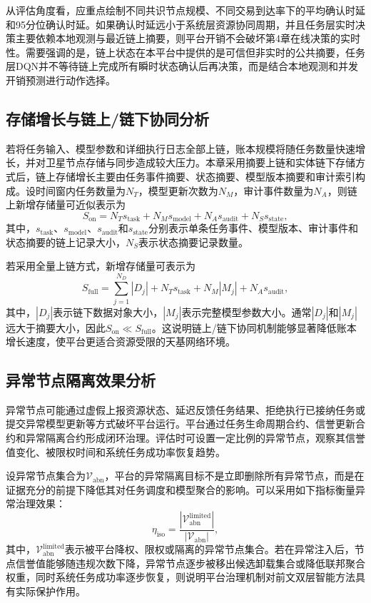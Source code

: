从评估角度看，应重点绘制不同共识节点规模、不同交易到达率下的平均确认时延和95分位确认时延。如果确认时延远小于系统层资源协同周期，并且任务层实时决策主要依赖本地观测与最近链上摘要，则平台开销不会破坏第4章在线决策的实时性。需要强调的是，链上状态在本平台中提供的是可信但非实时的公共摘要，任务层DQN并不等待链上完成所有瞬时状态确认后再决策，而是结合本地观测和并发开销预测进行动作选择。

\subsection{存储增长与链上/链下协同分析}

若将任务输入、模型参数和详细执行日志全部上链，账本规模将随任务数量快速增长，并对卫星节点存储与同步造成较大压力。本章采用摘要上链和实体链下存储方式后，链上存储增长主要由任务事件摘要、状态摘要、模型版本摘要和审计索引构成。设时间窗内任务数量为\(N_T\)，模型更新次数为\(N_M\)，审计事件数量为\(N_A\)，则链上新增存储量可近似表示为
\begin{equation}
  S_{\mathrm{on}}=N_T s_{\mathrm{task}}+N_M s_{\mathrm{model}}+N_A s_{\mathrm{audit}}+N_S s_{\mathrm{state}},
  \label{eq:onchain_storage}
\end{equation}
其中，\(s_{\mathrm{task}}\)、\(s_{\mathrm{model}}\)、\(s_{\mathrm{audit}}\)和\(s_{\mathrm{state}}\)分别表示单条任务事件、模型版本、审计事件和状态摘要的链上记录大小，\(N_S\)表示状态摘要记录数量。

若采用全量上链方式，新增存储量可表示为
\begin{equation}
  S_{\mathrm{full}}=\sum_{j=1}^{N_D}|D_j|+N_T s_{\mathrm{task}}+N_M |M_j|+N_A s_{\mathrm{audit}},
  \label{eq:full_storage}
\end{equation}
其中，\(|D_j|\)表示链下数据对象大小，\(|M_j|\)表示完整模型参数大小。通常\(|D_j|\)和\(|M_j|\)远大于摘要大小，因此\(S_{\mathrm{on}}\ll S_{\mathrm{full}}\)。这说明链上/链下协同机制能够显著降低账本增长速度，使平台更适合资源受限的天基网络环境。

\subsection{异常节点隔离效果分析}

异常节点可能通过虚假上报资源状态、延迟反馈任务结果、拒绝执行已接纳任务或提交异常模型更新等方式破坏平台运行。平台通过任务生命周期合约、信誉更新合约和异常隔离合约形成闭环治理。评估时可设置一定比例的异常节点，观察其信誉值变化、被限权时间和系统任务成功率恢复趋势。

设异常节点集合为\(\mathcal{V}_{\mathrm{abn}}\)，平台的异常隔离目标不是立即删除所有异常节点，而是在证据充分的前提下降低其对任务调度和模型聚合的影响。可以采用如下指标衡量异常治理效果：
\begin{equation}
  \eta_{\mathrm{iso}}=\frac{|\mathcal{V}_{\mathrm{abn}}^{\mathrm{limited}}|}{|\mathcal{V}_{\mathrm{abn}}|},
  \label{eq:isolation_ratio}
\end{equation}
其中，\(\mathcal{V}_{\mathrm{abn}}^{\mathrm{limited}}\)表示被平台降权、限权或隔离的异常节点集合。若在异常注入后，节点信誉值能够随违规次数下降，异常节点逐步被移出候选卸载集合或降低联邦聚合权重，同时系统任务成功率逐步恢复，则说明平台治理机制对前文双层智能方法具有实际保护作用。

